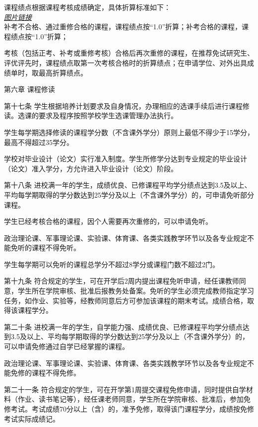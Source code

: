 \documentclass[UTF8,12pt,a4paper]{report}
\begin{document}
课程绩点根据课程考核成绩确定，具体折算标准如下：\\

\href{http://img01.fs.yiban.cn/out/thumb_550x0/aHR0cDovL3lmczAxLmZzLnlpYmFuLmNuL3dlYi83NTg4OTE0L3VwbG9hZC8xNTA0NzY5NDc2Mzc4OTYyLnBuZw==}{\textit{图片链接}}\\

补考不合格、通过重修合格的课程，课程绩点按“1.0”折算；补考合格的课程，课程绩点按“1.0”折算；

考核（包括正考、补考或重修考核）合格后再次重修的课程，在推荐免试研究生、评优评先时，课程绩点取第一次考核合格时的折算绩点；在申请学位、对外出具成绩单时，取最高折算绩点。



第六章  课程修读

第十七条  学生根据培养计划要求及自身情况，办理相应的选课手续后进行课程修读。选课的要求及程序按照学校学生选课管理办法执行。

学生每学期选择修读的课程学分数（不含课外学分）原则上最低不得少于15学分，最高不得超过35学分。

学校对毕业设计（论文）实行准入制度。学生所修学分达到专业规定的毕业设计（论文）准入学分，方允许进入毕业设计（论文）阶段。

第十八条  进校满一年的学生，成绩优良、已修课程平均学分绩点达到3.5及以上、平均每学期取得的学分数达到25学分及以上（不含课外学分）的，可申请免听部分课程。

学生已经考核合格的课程，因个人需要再次重修的，可以申请免听。

政治理论课、军事理论课、实验课、体育课、各类实践教学环节以及各专业规定不能免听的课程不得免听。

学生每学期可以免听的课程总学分不超过8学分或课程门数不超过2门。

第十九条  符合规定的学生，可在开学后2周内提出课程免听申请，经任课教师同意，学生所在学院审核、批准后报教务处备案。免听的学生必须完成教师指定学习任务，如作业、实验等，经教师同意后方可参加该课程的期末考试。成绩合格，取得该课程学分。

第二十条  进校满一年的学生，自学能力强、成绩优良、已修课程平均学分绩点达到3.5及以上、平均每学期取得的学分数达到25学分及以上（不含课外学分）的，可以申请免修通过自学已经掌握的课程。

政治理论课、军事理论课、实验课、体育课、各类实践教学环节以及各专业规定不能免修的课程不得免修。

第二十一条  符合规定的学生，可在开学第1周提交课程免修申请，同时提供自学材料（作业、读书笔记等），经任课老师同意，学生所在学院审核、批准后，参加免修考试。考试成绩70分以上（含）的，准予免修，取得该门课程学分，成绩按免修考试实际成绩记。
\end{document}
